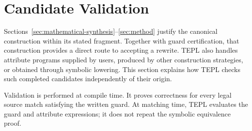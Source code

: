 \section{Candidate Validation}
\label{sec:candidate-validation}
Sections~\ref{sec:mathematical-synthesis}--\ref{sec:method}
justify the canonical construction within its stated fragment.
Together with guard certification, that construction provides a
direct route to accepting a rewrite. TEPL also handles attribute
programs supplied by users, produced by other construction strategies,
or obtained through symbolic lowering. This section explains how TEPL
checks such completed candidates independently of their origin.

Validation is performed at compile time. It proves correctness for
every legal source match satisfying the written guard. At matching
time, TEPL evaluates the guard and attribute expressions; it does
not repeat the symbolic equivalence proof.



